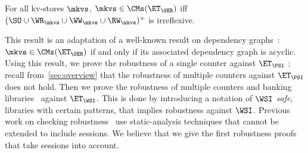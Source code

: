 \begin{theorem}
\label{thm:serialisable_nocycle}
For all kv-stores $\mkvs$, $\mkvs \in \CMs(\ET_{\SER})$ iff $(\SO \cup \WR_{\mkvs} 
\cup \WW_{\mkvs} \cup \RW_{\mkvs})^{+}$ is irreflexive.
\end{theorem}
This result is an adaptation of a well-known result on
dependency graphs~\cite{adya}: $\mkvs \in \CMs(\ET_{\SER})$ if and
only if its associated dependency graph is acyclic. 
Using this result, we prove the robustness of a single counter against $\ET_{\PSI}$ ; recall
from~\cref{sec:overview} that the robustness
of multiple counters against $\ET_{\PSI}$ does not hold.
Then we prove the robustness of multiple counters and banking libraries~\cite{bank-example-wsi} against $\ET_{\WSI}$. 
This is done by introducing a notation of \emph{\( \WSI \) safe}, libraries with certain patterns, that implies robustness against \( \WSI \).
Previous work on checking
robustness~\cite{giovanni_concur16,SIanalysis,laws,sureshConcur} use
static-analysis techniques that cannot be extended to include
sessions.  
We believe that we give the first robustness proofs
that take sessions into account.



